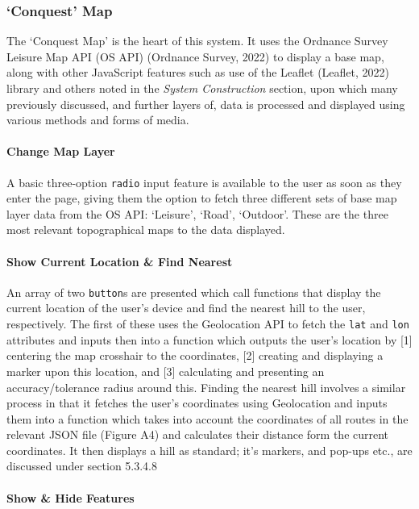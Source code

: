 \documentclass[11pt, english]{article}
\begin{document}
		\subsubsection{`Conquest' Map}

	The `Conquest Map' is the heart of this system. It uses the Ordnance Survey Leisure Map API (OS API) (Ordnance Survey, 2022) to display a base map, along with other JavaScript features such as use of the Leaflet (Leaflet, 2022) library and others noted in the \textit{System Construction} section, upon which many previously discussed, and further layers of, data is processed and displayed using various methods and forms of media.

			\paragraph{Change Map Layer}

	A basic three-option \texttt{radio} input feature is available to the user as soon as they enter the page, giving them the option to fetch three different sets of base map layer data from the OS API: `Leisure', `Road', `Outdoor'. These are the three most relevant topographical maps to the data displayed.

			\paragraph{Show Current Location \& Find Nearest}

	An array of two \texttt{button}s are presented which call functions that display the current location of the user's device and find the nearest hill to the user, respectively. The first of these uses the Geolocation API to fetch the \texttt{lat} and \texttt{lon} attributes and inputs then into a function which outputs the user's location by [1] centering the map crosshair to the coordinates, [2] creating and displaying a marker upon this location, and [3] calculating and presenting an accuracy/tolerance radius around this. Finding the nearest hill involves a similar process in that it fetches the user's coordinates using Geolocation and inputs them into a function which takes into account the coordinates of all routes in the relevant JSON file (Figure A4) and calculates their distance form the current coordinates. It then displays a hill as standard; it's markers, and pop-ups etc., are discussed under section 5.3.4.8

			\paragraph{Show \& Hide Features}
\end{document}
